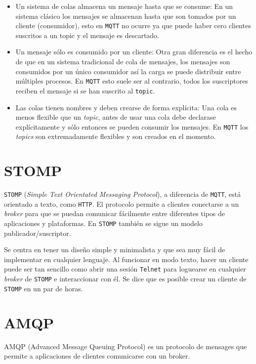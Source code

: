 \begin{itemize}\itemsep1pt \parskip0pt 
\item Un sistema de colas almacena un mensaje hasta que se consume: En un sistema
clásico los mensajes se almacenan hasta que son tomados por un cliente (consumidor),
esto en \texttt{MQTT} no ocurre ya que puede haber cero clientes suscritos a un
topic y el mensaje es descartado.
\item Un mensaje sólo es consumido por un cliente: Otra gran diferencia es el hecho
de que en un sistema tradicional de cola de mensajes, los mensajes son consumidos
por un único consumidor así la carga se puede distribuir entre múltiples procesos.
En \texttt{MQTT} esto suele ser al contrario, todos los suscriptores reciben el
mensaje si se han suscrito al \texttt{topic}.
\item Las colas tienen nombres y deben crearse de forma explícita: Una cola es
menos flexible que un \emph{topic}, antes de usar una cola debe declarase
explícitamente y sólo entonces se pueden consumir los mensajes. En \texttt{MQTT}
los \emph{topics} son extremadamente flexibles y son creados en el momento.
\end{itemize}

\section{STOMP}

\texttt{STOMP} (\emph{Simple Text Orientated Messaging Protocol}), a diferencia
de \texttt{MQTT}, está orientado a texto, como \texttt{HTTP}. El protocolo permite
a clientes conectarse a un \emph{broker} para que se puedan comunicar fácilmente
entre diferentes tipos de aplicaciones y plataformas.
En \texttt{STOMP} también se sigue un modelo publicador/suscriptor.

Se centra en tener un diseño simple y minimalista y que sea muy fácil de
implementar en cualquier lenguaje. Al funcionar en modo texto, hacer un cliente
puede ser tan sencillo como abrir una sesión \texttt{Telnet} para loguearse
en cualquier \emph{broker} de \texttt{STOMP} e interaccionar con él. Se dice
que es posible crear un cliente de \texttt{STOMP} en un par de horas.

\section{AMQP}

AMQP (Advanced Message Queuing Protocol) es un protocolo de mensages que permite
a aplicaciones de clientes comunicarse con un broker.

